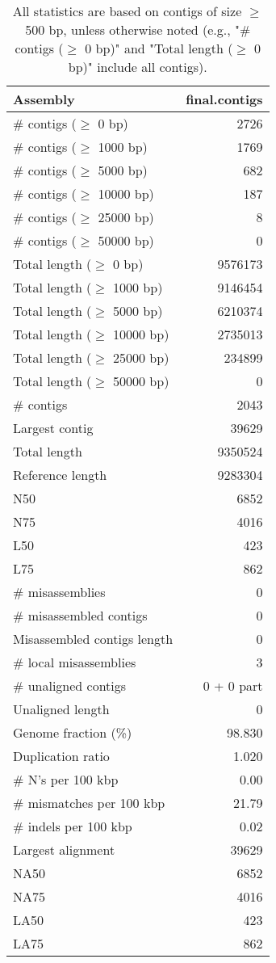 \documentclass[12pt,a4paper]{article}
\begin{document}
\begin{table}[ht]
\begin{center}
\caption{All statistics are based on contigs of size $\geq$ 500 bp, unless otherwise noted (e.g., "\# contigs ($\geq$ 0 bp)" and "Total length ($\geq$ 0 bp)" include all contigs).}
\begin{tabular}{|l*{1}{|r}|}
\hline
Assembly & final.contigs \\ \hline
\# contigs ($\geq$ 0 bp) & 2726 \\ \hline
\# contigs ($\geq$ 1000 bp) & 1769 \\ \hline
\# contigs ($\geq$ 5000 bp) & 682 \\ \hline
\# contigs ($\geq$ 10000 bp) & 187 \\ \hline
\# contigs ($\geq$ 25000 bp) & 8 \\ \hline
\# contigs ($\geq$ 50000 bp) & 0 \\ \hline
Total length ($\geq$ 0 bp) & 9576173 \\ \hline
Total length ($\geq$ 1000 bp) & 9146454 \\ \hline
Total length ($\geq$ 5000 bp) & 6210374 \\ \hline
Total length ($\geq$ 10000 bp) & 2735013 \\ \hline
Total length ($\geq$ 25000 bp) & 234899 \\ \hline
Total length ($\geq$ 50000 bp) & 0 \\ \hline
\# contigs & 2043 \\ \hline
Largest contig & 39629 \\ \hline
Total length & 9350524 \\ \hline
Reference length & 9283304 \\ \hline
N50 & 6852 \\ \hline
N75 & 4016 \\ \hline
L50 & 423 \\ \hline
L75 & 862 \\ \hline
\# misassemblies & 0 \\ \hline
\# misassembled contigs & 0 \\ \hline
Misassembled contigs length & 0 \\ \hline
\# local misassemblies & 3 \\ \hline
\# unaligned contigs & 0 + 0 part \\ \hline
Unaligned length & 0 \\ \hline
Genome fraction (\%) & 98.830 \\ \hline
Duplication ratio & 1.020 \\ \hline
\# N's per 100 kbp & 0.00 \\ \hline
\# mismatches per 100 kbp & 21.79 \\ \hline
\# indels per 100 kbp & 0.02 \\ \hline
Largest alignment & 39629 \\ \hline
NA50 & 6852 \\ \hline
NA75 & 4016 \\ \hline
LA50 & 423 \\ \hline
LA75 & 862 \\ \hline
\end{tabular}
\end{center}
\end{table}
\end{document}

